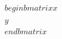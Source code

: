 \documentclass[preview]{standalone}
\begin{document}
\begin{align*}
\quad\\begin{bmatrix} x \quad\\\quad\\ y \quad\\end{bmatrix}
\end{align*}
\end{document}
